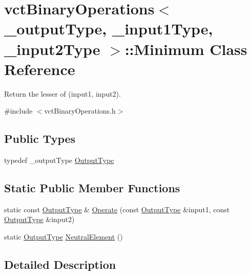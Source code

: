 \hypertarget{classvct_binary_operations_1_1_minimum}{\section{vct\-Binary\-Operations$<$ \-\_\-output\-Type, \-\_\-input1\-Type, \-\_\-input2\-Type $>$\-:\-:Minimum Class Reference}
\label{classvct_binary_operations_1_1_minimum}
}


Return the lesser of (input1, input2).  




{\ttfamily \#include $<$vct\-Binary\-Operations.\-h$>$}

\subsection*{Public Types}
\begin{DoxyCompactItemize}
\item 
typedef \-\_\-output\-Type \hyperlink{classvct_binary_operations_1_1_minimum_a3a43e1925b5600853520784d42b58299}{Output\-Type}
\end{DoxyCompactItemize}
\subsection*{Static Public Member Functions}
\begin{DoxyCompactItemize}
\item 
static const \hyperlink{classvct_binary_operations_1_1_minimum_a3a43e1925b5600853520784d42b58299}{Output\-Type} \& \hyperlink{classvct_binary_operations_1_1_minimum_a64198cb11c3be01a49d1114ff9ffd6c8}{Operate} (const \hyperlink{classvct_binary_operations_1_1_minimum_a3a43e1925b5600853520784d42b58299}{Output\-Type} \&input1, const \hyperlink{classvct_binary_operations_1_1_minimum_a3a43e1925b5600853520784d42b58299}{Output\-Type} \&input2)
\item 
static \hyperlink{classvct_binary_operations_1_1_minimum_a3a43e1925b5600853520784d42b58299}{Output\-Type} \hyperlink{classvct_binary_operations_1_1_minimum_a5b1f11cba02d44ef5b613f321e265c85}{Neutral\-Element} ()
\end{DoxyCompactItemize}


\subsection{Detailed Description}
